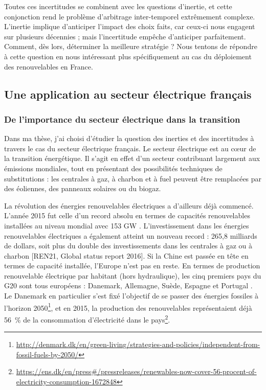 Toutes ces incertitudes se combinent avec les questions d’inertie, et cette conjonction rend le problème d’arbitrage inter-temporel extrêmement complexe. L’inertie implique d’anticiper l’impact des choix faits, car ceux-ci nous engagent sur plusieurs décennies ; mais l’incertitude empêche d’anticiper parfaitement. Comment, dès lors, déterminer la meilleure stratégie ? Nous tentons de répondre à cette question en nous intéressant plus spécifiquement au cas du déploiement des renouvelables en France.

\subsection{Une application au secteur électrique français}

\subsubsection{De l’importance du secteur électrique dans la transition}
Dans ma thèse, j’ai choisi d’étudier la question des inerties et des incertitudes à travers le cas du secteur électrique français. Le secteur électrique est au cœur de la transition énergétique. Il s’agit en effet d’un secteur contribuant largement aux émissions mondiales, tout en présentant des possibilités techniques de substitutions : les centrales à gaz, à charbon et à fuel peuvent être remplacées par des éoliennes, des panneaux solaires ou du biogaz.

La révolution des énergies renouvelables électriques a d’ailleurs déjà commencé. L’année 2015 fut celle d’un record absolu en termes de capacités renouvelables installées au niveau mondial avec 153 GW \citep{InternationalEnergyAgency2016}. L’investissement dans les énergies renouvelables électriques a également atteint un nouveau record : 265,8 milliards de dollars, soit plus du double des investissements dans les centrales à gaz ou à charbon [REN21, Global status report 2016]. 
Si la Chine est passée en tête en termes de capacité installée, l’Europe n’est pas en reste. En termes de production renouvelable électrique par habitant (hors hydraulique), les cinq premiers pays du G20 sont tous européens : Danemark, Allemagne, Suède, Espagne et Portugal \citep[p. 21]{REN212016}. Le Danemark en particulier s’est fixé l’objectif de se passer des énergies fossiles à l’horizon 2050\footnote{\url{http://denmark.dk/en/green-living/strategies-and-policies/independent-from-fossil-fuels-by-2050/}}, et en 2015, la production des renouvelables représentaient déjà 56~\% de la consommation d'électricité dans le pays\footnote{\url{https://ens.dk/en/press\#/pressreleases/renewables-now-cover-56-procent-of-electricity-consumption-1672848}}. 

